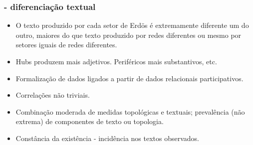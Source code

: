\documentclass[10pt]{beamer}
\begin{document}
\begin{frame}
\frametitle{- diferenciação textual}
\begin{itemize}
	\item O texto produzido por cada setor de Erdös é extremamente diferente um do outro, maiores do que texto produzido por redes diferentes ou mesmo por setores iguais de redes diferentes.
	\item Hubs produzem mais adjetivos. Periféricos mais substantivos, etc.
	\item Formalização de dados ligados a partir de dados relacionais participativos.
	\item Correlações não triviais.
	\item Combinação moderada de medidas topológicas e textuais; prevalência (não extrema) de componentes de texto ou topologia.
	\item Constância da existência - incidência nos textos observados.
\end{itemize}
\end{frame}
\end{document}
